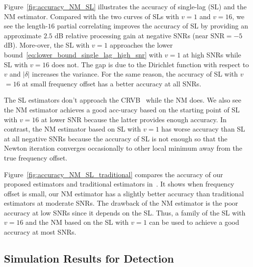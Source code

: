 Figure~\ref{fig:accuracy_NM_SL} illustrates the accuracy of single-lag (SL) and the NM estimator.
Compared with the two curves of SLs with $v{=}1$ and $v{=}16$, 
we see the length-$16$ partial correlating
improves the accuracy of SL by providing an approximate $2.5$ dB relative processing gain at negative SNRs (near $\text{SNR}=-5$ dB).
More-over, the SL with $v{=}1$ approaches the lower bound~\eqref{eq:lower_bound_single_lag_high_snr} with $v=1$ at high SNRs
while SL with $v{=}16$ does not. 
The gap is due to the Dirichlet function 
with respect to $v$ and $|\delta|$
increases the variance. 
For the same reason, the accuracy of SL with $v$
${=}16$ at small frequency offset has a better accuracy at all SNRs.

The SL estimators don't approach the CRVB~\cite{Gini_98} while the NM does. 
We also see the NM estimator achieves a good acc-uracy 
based on the starting point of SL with $v=16$ at lower SNR
because the latter provides enough accuracy. 
In contrast, the NM estimator based on SL with $v=1$ has worse accuracy than SL 
at all negative SNRs because the accuracy of SL is not enough so that the Newton iteration converges occasionally to 
other local minimum away from the true frequency offset.

Figure~\ref{fig:accuracy_NM_SL_traditional} compares the accuracy of our proposed estimators
and traditional estimators in~\cite{kay_89,Fitz_94,Luise_Reggiannini_95}. It shows when 
frequency offset is small, our NM estimator has a slightly better accuracy than traditional estimators at moderate SNRs.
The drawback of the NM estimator is the poor accuracy at low SNRs since it depends on the 
SL. Thus, a family of the SL with $v=16$ and the NM based on the SL with $v=1$ can be used 
to achieve a good accuracy at most SNRs.

\subsection{Simulation Results for Detection}



